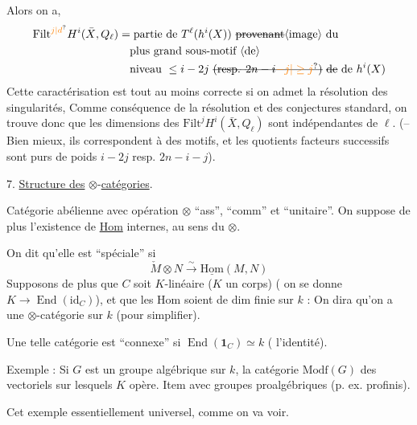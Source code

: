 Alors on a, 
\[
\begin{aligned}
\mathrm{Filt}^{\unsure{j|d}} H^i(\bar X,Q_\ell)&=\text{partie de }T^\ell(h^i(X))\ \text{\deleted{provenant}\inserted{image} du}\\
&\quad\text{plus grand sous-motif \inserted{de}}\\
&\quad\text{niveau }\leq i-2j\ \text{\deleted{(resp. $2n-i\unsure{-j|\geq j}$)} \deleted{de} de }h^i(X)
\end{aligned}
\]
Cette caractérisation  est tout au moins correcte si on admet la résolution des singularités,   Comme conséquence de la résolution et des conjectures standard, on trouve donc que les dimensions des $\mathrm{Filt}^j H^i(\bar X,Q_\ell)$ sont indépendantes de $\ell$. (-- Bien mieux, ils correspondent à des motifs, et les quotients facteurs successifs sont  purs de poids $i-2j$ resp. $2n-i-j$).

7. \uline{Structure des} $\otimes$-\uline{catégories}. 

 Catégorie abélienne avec opération $\otimes$ ``ass'', ``comm'' et ``unitaire''. On suppose de plus l'existence de \uline{Hom} internes, au sens du $\otimes$.

On dit qu'elle est ``spéciale'' si
\[
\check M\otimes N\xrightarrow{\sim}\underline{\mathrm{Hom}}(M,N)
\]
Supposons de plus que $C$ soit $K$-linéaire ($K$ un corps) ( on se donne $K\longrightarrow\operatorname{End}(\mathrm{id}_{C})$), et que les Hom soient de dim finie sur $k$ :  On dira qu'on a une $\otimes$-catégorie sur $k$ (pour simplifier).

Une telle catégorie est  ``connexe'' si $\operatorname{End}(\mathbf{1}_C)\simeq k$ ( l'identité).

Exemple : Si $G$ est un groupe algébrique sur $k$, la catégorie $\mathrm{Modf}(G)$ des vectoriels sur lesquels $K$ opère. Item avec groupes proalgébriques (p. ex. profinis).

Cet exemple  essentiellement universel, comme on va voir.

